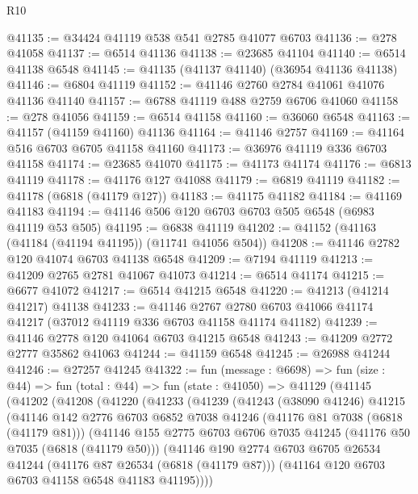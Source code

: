 \begin{lexlean}{R10}
\begin{coremodule}
@41135 := @34424 @41119 @538 @541 @2785 @41077 @6703
@41136 := @278 @41058
@41137 := @6514 @41136
@41138 := @23685 @41104
@41140 := @6514 @41138 @6548
@41145 := @41135 (@41137 @41140) (@36954 @41136 @41138)
@41146 := @6804 @41119
@41152 := @41146 @2760 @2784 @41061 @41076 @41136 @41140
@41157 := @6788 @41119 @488 @2759 @6706 @41060
@41158 := @278 @41056
@41159 := @6514 @41158
@41160 := @36060 @6548
@41163 := @41157 (@41159 @41160) @41136
@41164 := @41146 @2757
@41169 := @41164 @516 @6703 @6705 @41158 @41160
@41173 := @36976 @41119 @336 @6703 @41158
@41174 := @23685 @41070
@41175 := @41173 @41174
@41176 := @6813 @41119
@41178 := @41176 @127 @41088
@41179 := @6819 @41119
@41182 := @41178 (@6818 (@41179 @127))
@41183 := @41175 @41182
@41184 := @41169 @41183
@41194 := @41146 @506 @120 @6703 @6703 @505 @6548 (@6983 @41119 @53 @505)
@41195 := @6838 @41119
@41202 := @41152 (@41163 (@41184 (@41194 @41195)) (@11741 @41056 @504))
@41208 := @41146 @2782 @120 @41074 @6703 @41138 @6548
@41209 := @7194 @41119
@41213 := @41209 @2765 @2781 @41067 @41073
@41214 := @6514 @41174
@41215 := @6677 @41072
@41217 := @6514 @41215 @6548
@41220 := @41213 (@41214 @41217) @41138
@41233 := @41146
    @2767
    @2780
    @6703
    @41066
    @41174
    @41217
    (@37012 @41119 @336 @6703 @41158 @41174 @41182)
@41239 := @41146 @2778 @120 @41064 @6703 @41215 @6548
@41243 := @41209 @2772 @2777 @35862 @41063
@41244 := @41159 @6548
@41245 := @26988 @41244
@41246 := @27257 @41245
@41322 := fun (message : @6698) =>
  fun (size : @44) =>
  fun (total : @44) =>
  fun (state : @41050) =>
  @41129
    (@41145
      (@41202
        (@41208
          (@41220
            (@41233
              (@41239
                (@41243
                  (@38090 @41246)
                  @41215
                  (@41146
                    @142
                    @2776
                    @6703
                    @6852
                    @7038
                    @41246
                    (@41176 @81 @7038 (@6818 (@41179 @81)))
                    (@41146
                      @155
                      @2775
                      @6703
                      @6706
                      @7035
                      @41245
                      (@41176 @50 @7035 (@6818 (@41179 @50)))
                      (@41146
                        @190
                        @2774
                        @6703
                        @6705
                        @26534
                        @41244
                        (@41176 @87 @26534 (@6818 (@41179 @87)))
                        (@41164 @120 @6703 @6703 @41158 @6548 @41183 @41195))))

\end{coremodule}
\end{lexlean}
